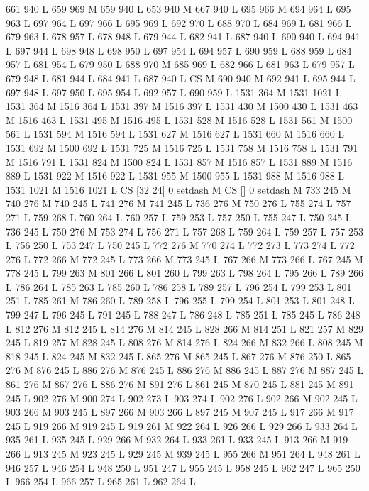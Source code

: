 {{{{{{{{{{{{{{{{{{{{{{{{661 940 L
659 969 M 659 940 L
653 940 M 667 940 L
695 966 M 694 964 L
695 963 L
697 964 L
697 966 L
695 969 L
692 970 L
688 970 L
684 969 L
681 966 L
679 963 L
678 957 L
678 948 L
679 944 L
682 941 L
687 940 L
690 940 L
694 941 L
697 944 L
698 948 L
698 950 L
697 954 L
694 957 L
690 959 L
688 959 L
684 957 L
681 954 L
679 950 L
688 970 M 685 969 L
682 966 L
681 963 L
679 957 L
679 948 L
681 944 L
684 941 L
687 940 L
CS M
690 940 M 692 941 L
695 944 L
697 948 L
697 950 L
695 954 L
692 957 L
690 959 L
1531 364 M 1531 1021 L
1531 364 M 1516 364 L
1531 397 M 1516 397 L
1531 430 M 1500 430 L
1531 463 M 1516 463 L
1531 495 M 1516 495 L
1531 528 M 1516 528 L
1531 561 M 1500 561 L
1531 594 M 1516 594 L
1531 627 M 1516 627 L
1531 660 M 1516 660 L
1531 692 M 1500 692 L
1531 725 M 1516 725 L
1531 758 M 1516 758 L
1531 791 M 1516 791 L
1531 824 M 1500 824 L
1531 857 M 1516 857 L
1531 889 M 1516 889 L
1531 922 M 1516 922 L
1531 955 M 1500 955 L
1531 988 M 1516 988 L
1531 1021 M 1516 1021 L
CS [32 24] 0 setdash M
CS [] 0 setdash M
733 245 M 740 276 M 740 245 L
741 276 M 741 245 L
736 276 M 750 276 L
755 274 L
757 271 L
759 268 L
760 264 L
760 257 L
759 253 L
757 250 L
755 247 L
750 245 L
736 245 L
750 276 M 753 274 L
756 271 L
757 268 L
759 264 L
759 257 L
757 253 L
756 250 L
753 247 L
750 245 L
772 276 M 770 274 L
772 273 L
773 274 L
772 276 L
772 266 M 772 245 L
773 266 M 773 245 L
767 266 M 773 266 L
767 245 M 778 245 L
799 263 M 801 266 L
801 260 L
799 263 L
798 264 L
795 266 L
789 266 L
786 264 L
785 263 L
785 260 L
786 258 L
789 257 L
796 254 L
799 253 L
801 251 L
785 261 M 786 260 L
789 258 L
796 255 L
799 254 L
801 253 L
801 248 L
799 247 L
796 245 L
791 245 L
788 247 L
786 248 L
785 251 L
785 245 L
786 248 L
812 276 M 812 245 L
814 276 M 814 245 L
828 266 M 814 251 L
821 257 M 829 245 L
819 257 M 828 245 L
808 276 M 814 276 L
824 266 M 832 266 L
808 245 M 818 245 L
824 245 M 832 245 L
865 276 M 865 245 L
867 276 M 876 250 L
865 276 M 876 245 L
886 276 M 876 245 L
886 276 M 886 245 L
887 276 M 887 245 L
861 276 M 867 276 L
886 276 M 891 276 L
861 245 M 870 245 L
881 245 M 891 245 L
902 276 M 900 274 L
902 273 L
903 274 L
902 276 L
902 266 M 902 245 L
903 266 M 903 245 L
897 266 M 903 266 L
897 245 M 907 245 L
917 266 M 917 245 L
919 266 M 919 245 L
919 261 M 922 264 L
926 266 L
929 266 L
933 264 L
935 261 L
935 245 L
929 266 M 932 264 L
933 261 L
933 245 L
913 266 M 919 266 L
913 245 M 923 245 L
929 245 M 939 245 L
955 266 M 951 264 L
948 261 L
946 257 L
946 254 L
948 250 L
951 247 L
955 245 L
958 245 L
962 247 L
965 250 L
966 254 L
966 257 L
965 261 L
962 264 L
}}}}}}}}}}}}}}}}}}}}}}}}
